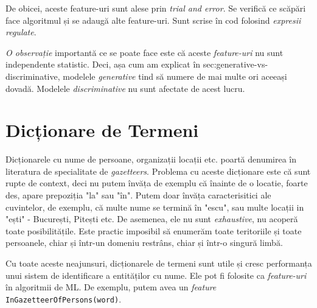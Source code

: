 De obicei, aceste feature-uri sunt alese prin \textit{trial and error}. Se verifică ce scăpări face algoritmul și se adaugă alte feature-uri. Sunt scrise în cod folosind \textit{expresii regulate}.

\textit{O observație} importantă ce se poate face este că aceste \textit{feature-uri} nu sunt independente statistic. Deci, așa cum am explicat în 
{sec:generative-vs-discriminative}, modelele \textit{generative} tind să numere de mai multe ori aceeași dovadă. Modelele \textit{discriminative} nu sunt afectate de acest lucru.

\section{Dicționare de Termeni}
Dicționarele cu nume de persoane, organizații locații etc. poartă denumirea în literatura de specialitate de \textit{gazetteers}. Problema cu aceste dicționare este că sunt rupte de context, deci nu putem învăța de exemplu că înainte de o locatie, foarte des, apare prepoziția "la" sau "în". Putem doar învăța caracterisitici ale cuvintelor, de exemplu, că multe nume se termină în "escu", sau multe locații in "ești" - București, Pitești etc. De asemenea, ele nu sunt \textit{exhaustive}, nu acoperă toate posibilitățile. Este practic imposibil să enumerăm toate teritoriile și toate persoanele, chiar și într-un domeniu restrâns, chiar și într-o singură limbă.

Cu toate aceste neajunsuri, dicționarele de termeni sunt utile și cresc performanța unui sistem de identificare a entităților cu nume. Ele pot fi folosite ca \textit{feature-uri} în algoritmii de ML. De exemplu, putem avea un \textit{feature} \texttt{InGazetteerOfPersons(word)}.







